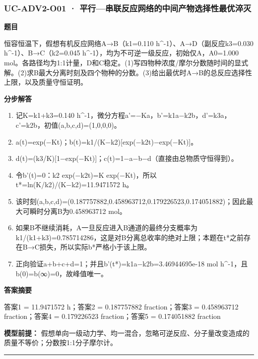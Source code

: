 \documentclass[UTF8,11pt,a4paper]{ctexart}
\begin{document}
\subsubsection*{UC-ADV2-O01 · 平行—串联反应网络的中间产物选择性最优淬灭}
\noindent\textbf{题目}\par
恒容恒温下，假想有机反应网络A→B（k1=0.110 h\textasciicircum{}-1）、A→D（副反应k3=0.030 h\textasciicircum{}-1）、B→C（k2=0.045 h\textasciicircum{}-1），均为不可逆一级反应，初始仅A，A0=1.000 mol。各路径均为1:1计量，D和C稳定。(1)写四物种浓度/摩尔分数随时间的显式解。(2)求B最大分离时刻及四个物种的分数。(3)给出最优时A→B的总反应选择性上限，以及质量守恒证明。\par
\medskip\noindent\textbf{分步解答}
\begin{enumerate}
\item 记K=k1+k3=0.140 h\textasciicircum{}-1，微分方程a'=−Ka，b'=k1a−k2b，d'=k3a，c'=k2b，初值(a,b,c,d)=(1,0,0,0)。
\item a(t)=exp(−Kt)；b(t)=k1/(K−k2)[exp(−k2t)−exp(−Kt)]。
\item d(t)=(k3/K)[1−exp(−Kt)]；c(t)=1−a−b−d（直接由总物质守恒得到）。
\item 令b'(t)=0：k2 exp(−k2t)=K exp(−Kt)，所以t*=ln(K/k2)/(K−k2)=11.9471572 h。
\item 该时刻(a,b,c,d)=(0.187757882,0.458963712,0.179226523,0.174051882)；因此最大可瞬时分离B为0.458963712 mol。
\item 如果B不继续消耗，A一旦反应进入B通道的最终分支概率为k1/(k1+k3)=0.785714286，这是对B分离总收率的绝对上限；本题在t*之前存在B→C损失，所以实际b*严格小于该上限。
\item 正向验证a+b+c+d=1；并且b'(t*)=k1a−k2b=3.46944695e-18 mol h\textasciicircum{}-1，且b(0)=b(∞)=0，故峰值唯一。
\end{enumerate}
\noindent\textbf{答案摘要}\par
答案1 = 11.9471572 h；答案2 = 0.187757882 fraction；答案3 = 0.458963712 fraction；答案4 = 0.179226523 fraction；答案5 = 0.174051882 fraction\par
\noindent\textbf{模型前提：}
假想单向一级动力学、均一混合，忽略可逆反应、分子量改变造成的质量不等价；分数按1:1分子摩尔计。\par
\medskip\hrule\medskip
{}
\end{document}
